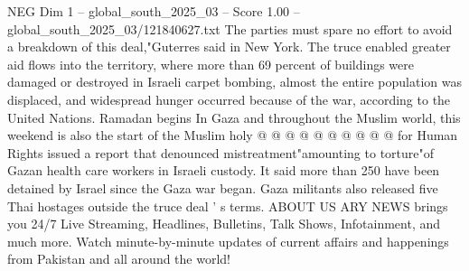 \begin{textsample}{NEG Dim 1 – global\_south\_2025\_03 – Score 1.00 – global\_south\_2025\_03/121840627.txt}
The parties must spare no effort to avoid a breakdown of this deal,"Guterres said in New York.
The truce enabled greater aid flows into the territory, where more than 69 percent of buildings were damaged or destroyed in Israeli carpet bombing, almost the entire population was displaced, and widespread hunger occurred because of the war, according to the United Nations.
Ramadan begins In Gaza and throughout the Muslim world, this weekend is also the start of the Muslim holy @ @ @ @ @ @ @ @ @ @ for Human Rights issued a report that denounced mistreatment"amounting to torture"of Gazan health care workers in Israeli custody.
It said more than 250 have been detained by Israel since the Gaza war began.
Gaza militants also released five Thai hostages outside the truce deal ' s terms.
ABOUT US ARY NEWS brings you 24/7 Live Streaming, Headlines, Bulletins, Talk Shows, Infotainment, and much more.
Watch minute-by-minute updates of current affairs and happenings from Pakistan and all around the world!

\end{textsample}
